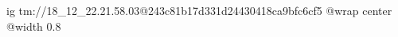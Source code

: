  
 
 
 
 

\qqSecCmtScr


\ifcmt
  ig tm://18_12_22.21.58.03@243c81b17d331d24430418ca9bfc6cf5
  @wrap center
  @width 0.8
\fi

